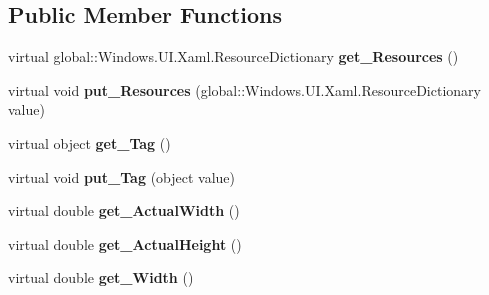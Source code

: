 \subsection*{Public Member Functions}
\begin{DoxyCompactItemize}
\item 
\mbox{\label{class_windows_1_1_u_i_1_1_xaml_1_1_framework_element_a933790d636d5d0e5dffc0eeccfea0e49}} 
virtual global\+::\+Windows.\+U\+I.\+Xaml.\+Resource\+Dictionary {\bfseries get\+\_\+\+Resources} ()
\item 
\mbox{\label{class_windows_1_1_u_i_1_1_xaml_1_1_framework_element_a203f639c05e0324e1d6c6eac84b913bb}} 
virtual void {\bfseries put\+\_\+\+Resources} (global\+::\+Windows.\+U\+I.\+Xaml.\+Resource\+Dictionary value)
\item 
\mbox{\label{class_windows_1_1_u_i_1_1_xaml_1_1_framework_element_ab65e3451cf2788c7a6f3e371c6713c95}} 
virtual object {\bfseries get\+\_\+\+Tag} ()
\item 
\mbox{\label{class_windows_1_1_u_i_1_1_xaml_1_1_framework_element_ac5e489cfe8d78a833e14d85301344eff}} 
virtual void {\bfseries put\+\_\+\+Tag} (object value)
\item 
\mbox{\label{class_windows_1_1_u_i_1_1_xaml_1_1_framework_element_a694d845ee3ba82db8477d93cf3195457}} 
virtual double {\bfseries get\+\_\+\+Actual\+Width} ()
\item 
\mbox{\label{class_windows_1_1_u_i_1_1_xaml_1_1_framework_element_a4b30157662f4b1516d4e21297a591188}} 
virtual double {\bfseries get\+\_\+\+Actual\+Height} ()
\item 
\mbox{\label{class_windows_1_1_u_i_1_1_xaml_1_1_framework_element_af41531ee60692baab5862c9a7d5cfa81}} 
virtual double {\bfseries get\+\_\+\+Width} ()
\item 
\mbox{\label{class_windows_1_1_u_i_1_1_xaml_1_1_framework_element_a9f5305e5ef018d2e6685349eb7294ee1}} 

\end{DoxyCompactItemize}
